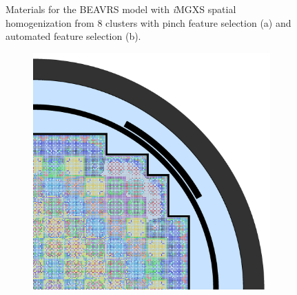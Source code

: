 \begin{figure}[h!]
\begin{subfigure}{0.68\textwidth}
  \caption{}
  \label{fig:chap10-full-core-combined-8}
\end{subfigure}
\caption[Materials for BEAVRS with clustering homogenization (8 clusters)]{Materials for the \ac{BEAVRS} model with \textit{i}\ac{MGXS} spatial homogenization from 8 clusters with pinch feature selection (a) and automated feature selection (b).}
\label{fig:chap10-full-core-geometries-8}
\end{figure}

\clearpage

\begin{figure}[h!]
\centering
\begin{subfigure}{0.68\textwidth}
  \centering
  \includegraphics[width=\linewidth]{figures/unsupervised/geometries/with-features/16-clusters/pinch/full-core}
  \caption{}
  \label{fig:chap10-full-core-pinch-16}
\end{subfigure}
\begin{subfigure}{0.68\textwidth}
  \centering

\end{subfigure}
\end{figure}
